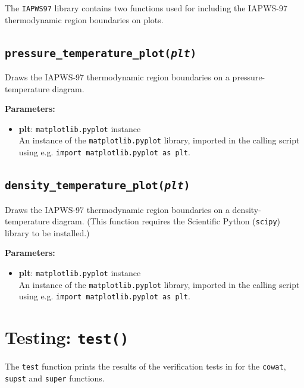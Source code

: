 The \texttt{IAPWS97} library contains two functions used for including the IAPWS-97 thermodynamic region boundaries on plots.

\subsection{\texttt{pressure\_temperature\_plot(\emph{plt})}}

Draws the IAPWS-97 thermodynamic region boundaries on a pressure-temperature diagram.

\textbf{Parameters:}
\begin{itemize}
\item \textbf{plt}: \texttt{matplotlib.pyplot} instance\\
  An instance of the \texttt{matplotlib.pyplot} library, imported in the calling script using e.g. \texttt{import matplotlib.pyplot as plt}.
\end{itemize}

\subsection{\texttt{density\_temperature\_plot(\emph{plt})}}

Draws the IAPWS-97 thermodynamic region boundaries on a density-temperature diagram.  (This function requires the Scientific Python (\texttt{scipy}) library to be installed.)

\textbf{Parameters:}
\begin{itemize}
\item \textbf{plt}: \texttt{matplotlib.pyplot} instance\\
  An instance of the \texttt{matplotlib.pyplot} library, imported in the calling script using e.g. \texttt{import matplotlib.pyplot as plt}.
\end{itemize}

\section{Testing: \texttt{test()}}

The \texttt{test} function prints the results of the verification tests in \cite{iapws_2000} for the \texttt{cowat}, \texttt{supst} and \texttt{super} functions.
